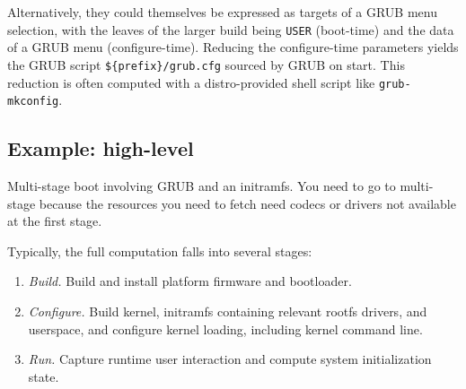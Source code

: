 Alternatively, they could themselves be expressed as targets of a GRUB
menu selection, with the leaves of the larger build being \texttt{USER}
(boot-time) and the data of a GRUB menu (configure-time). Reducing the
configure-time parameters yields the GRUB script
\texttt{\$\{prefix\}/grub.cfg} sourced by GRUB on start. This reduction
is often computed with a distro-provided shell script like
\texttt{grub-mkconfig}.

\hypertarget{example-high-level}{%
\subsection{Example: high-level}\label{example-high-level}}

Multi-stage boot involving GRUB and an initramfs. 
%
You need to go to multi-stage because the resources you need to fetch need codecs or drivers not available at the first stage.

Typically, the full computation falls into several stages:
\begin{enumerate}
  \item \emph{Build.} Build and install platform firmware and bootloader.
  \item \emph{Configure.} Build kernel, initramfs containing relevant rootfs drivers, and userspace, and configure kernel loading, including kernel command line.
  \item \emph{Run.} Capture runtime user interaction and compute system initialization state.
\end{enumerate}

